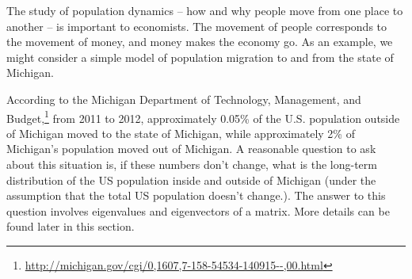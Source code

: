  \label{sec:eigenspaces}

\vspace*{-17 pt}

\vspace*{13 pt}


The study of population dynamics -- how and why people move from one place to another -- is important to economists. The movement of people corresponds to the movement of money, and money makes the economy go. As an example, we might consider a simple model of population migration to and from the state of Michigan.

According to the Michigan Department of Technology, Management, and Budget,\footnote{\url{http://michigan.gov/cgi/0,1607,7-158-54534-140915--,00.html}} from 2011 to 2012, approximately 0.05\% of the U.S. population outside of Michigan moved to the state of Michigan, while approximately 2\% of Michigan's population moved out of Michigan. A reasonable question to ask about this situation is, if these numbers don't change, what is the long-term distribution of the US population inside and outside of Michigan (under the assumption that the total US population doesn't change.). The answer to this question involves eigenvalues and eigenvectors of a matrix. More details can be found later in this section. 





